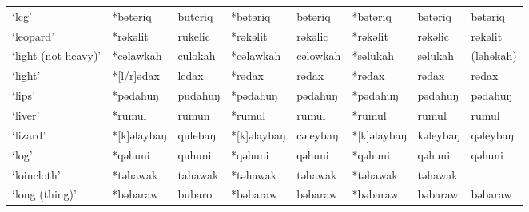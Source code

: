 \begin{landscape}
\begin{longtable}[c]{@{}p{3cm}<{\raggedright}p{2.75cm}<{\raggedright}p{2.75cm}<{\raggedright}p{2.75cm}<{\raggedright}p{2.75cm}<{\raggedright}p{2.75cm}<{\raggedright}p{2.75cm}<{\raggedright}p{2.75cm}<{\raggedright}@{}}
`leg'                                                & *bətəriq     & buteriq                       & *bətəriq       & bətəriq                    & *bətəriq         & bətəriq                  & bətəriq                           \\
`leopard'                                            & *rəkəlit     & rukelic                       & *rəkəlit       & rəkəlic                    & *rəkəlit         & rəkəlic                  & rəkəlit                           \\
`light (not heavy)'                                  & *cəlawkah    & culokah                       & *cəlawkah      & cəlowkah                   & *səlukah         & səlukah                  & (ləhəkah)                         \\
`light'                                              & *[l/r]ədax   & ledax                         & *rədax         & rədax                      & *rədax           & rədax                    & rədax                             \\
`lips'                                               & *pədahuŋ     & pudahuŋ                       & *pədahuŋ       & pədahuŋ                    & *pədahuŋ         & pədahuŋ                  & pədahuŋ                           \\
`liver'                                              & *rumul       & rumun                         & *rumul         & rumul                      & *rumul           & rumul                    & rumul                             \\
`lizard'                                             & *[k]əlaybaŋ  & qulebaŋ                       & *[k]əlaybaŋ    & cəleybaŋ                   & *[k]əlaybaŋ      & kəleybaŋ                 & qəleybaŋ                          \\
`log'                                                & *qəhuni      & quhuni                        & *qəhuni        & qəhuni                     & *qəhuni          & qəhuni                   & qəhuni                            \\
`loincloth'                                          & *təhawak     & tahawak                       & *təhawak       & təhawak                    & *təhawak         & təhawak                  &                                   \\
`long (thing)'                                       & *bəbaraw     & bubaro                        & *bəbaraw       & bəbaraw                    & *bəbaraw         & bəbaraw                  & bəbaraw                           \\

\end{longtable}
\end{landscape}
